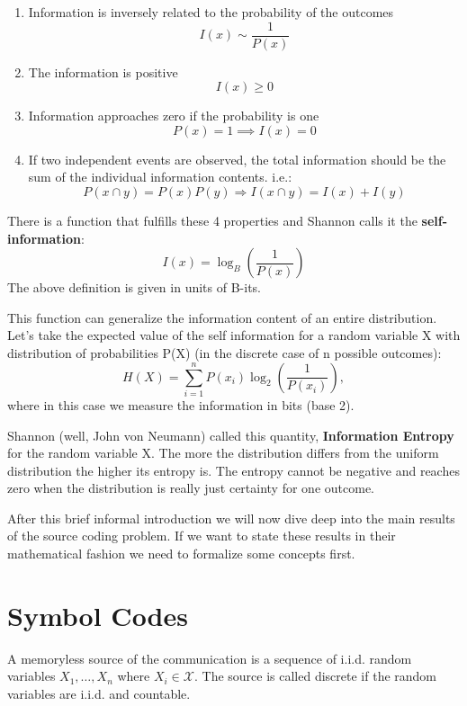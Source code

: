 \begin{enumerate}
	\item  Information is inversely related to the probability of the outcomes
	$$I(x) \sim \frac{1}{P(x)}$$
	\item The information is positive
	$$I(x) \ge 0$$
	\item Information approaches zero if the probability is one 
	$$P(x) = 1 \implies I(x)=0$$
	\item If two independent events are observed, the total information should be the sum of the individual information contents.
	i.e.:
	$$P(x \cap y) = P(x)P(y) \Longrightarrow I(x \cap y) = I(x) + I(y)$$
\end{enumerate}

There is a function that fulfills these 4 properties and Shannon calls it the \textbf{self-information}: 
$$I(x) = \log_B(\frac{1}{P(x)})$$
The above definition is given in units of B-its. 

This function can generalize the information content of an entire distribution. Let's take the expected value of the self information for a random variable X with distribution of probabilities P(X) (in the discrete case of n possible outcomes):
$$H(X) = \sum_{i=1}^ n P(x_i)\log_2\left(\frac{1}{P(x_i)}\right),$$
where in this case we measure the information in bits (base 2).

Shannon (well, John von Neumann) called this quantity, \textbf{Information Entropy} for the random variable X.
The more the distribution differs from the uniform distribution the higher its entropy is. The entropy cannot be negative and reaches zero when the distribution is really just certainty for one outcome.

After this brief informal introduction we will now dive deep into the main results of the source coding problem. If we want to state these results in their mathematical fashion we need to formalize some concepts first.

\section{Symbol Codes}

\begin{definition}
	A memoryless source of the communication is a sequence of i.i.d. random variables $X_1, \dots, X_n$ where $X_i \in \mathcal{X}$. \newline
	The source is called discrete if the random variables are i.i.d. and countable. 
\end{definition}

